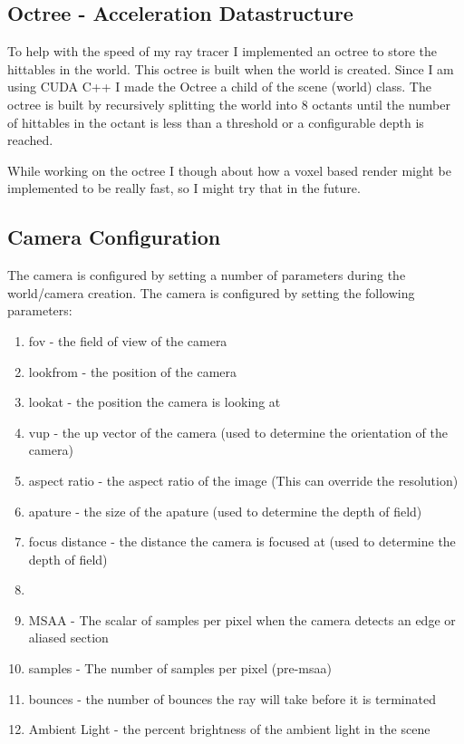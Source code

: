 \documentclass{article}
\begin{document}
    \subsection{Octree - Acceleration Datastructure} 
    To help with the speed of my ray tracer I implemented an octree to store the hittables in the world. This octree is built when the world is created. Since I am using CUDA C++ I made the Octree a child of the scene (world) class. The octree is built by recursively splitting the world into 8 octants until the number of hittables in the octant is less than a threshold or a configurable depth is reached. \par 
    While working on the octree I though about how a voxel based render might be implemented to be really fast, so I might try that in the future. \par   




    \subsection{Camera Configuration}
    The camera is configured by setting a number of parameters during the world/camera creation. The camera is configured by setting the following parameters: \par
    \begin{enumerate}
        \item fov - the field of view of the camera
        \item lookfrom - the position of the camera
        \item lookat - the position the camera is looking at
        \item vup - the up vector of the camera (used to determine the orientation of the camera)
        \item aspect ratio - the aspect ratio of the image (This can override the resolution)
        \item apature - the size of the apature (used to determine the depth of field)
        \item focus distance - the distance the camera is focused at (used to determine the depth of field)
        \item \quad
        \item MSAA - The scalar of samples per pixel when the camera detects an edge or aliased section 
        \item samples - The number of samples per pixel (pre-msaa)
        \item bounces - the number of bounces the ray will take before it is terminated
        \item Ambient Light - the percent brightness of the ambient light in the scene 
    \end{enumerate}
\end{document}
